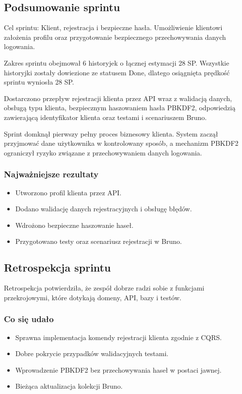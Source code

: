 \documentclass[12pt,a4paper]{article}
\begin{document}
\subsection*{Podsumowanie sprintu}
Cel sprintu: Klient, rejestracja i bezpieczne hasła. Umożliwienie klientowi założenia profilu oraz przygotowanie bezpiecznego przechowywania danych logowania.

Zakres sprintu obejmował 6 historyjek o łącznej estymacji 28 SP. Wszystkie historyjki zostały dowiezione ze statusem Done, dlatego osiągnięta prędkość sprintu wyniosła 28 SP.

Dostarczono przepływ rejestracji klienta przez API wraz z walidacją danych, obsługą typu klienta, bezpiecznym haszowaniem hasła PBKDF2, odpowiedzią zawierającą identyfikator klienta oraz testami i scenariuszem Bruno.

Sprint domknął pierwszy pełny proces biznesowy klienta. System zaczął przyjmować dane użytkownika w kontrolowany sposób, a mechanizm PBKDF2 ograniczył ryzyko związane z przechowywaniem danych logowania.

\subsubsection*{Najważniejsze rezultaty}
\begin{itemize}
\item Utworzono profil klienta przez API.
\item Dodano walidację danych rejestracyjnych i obsługę błędów.
\item Wdrożono bezpieczne haszowanie haseł.
\item Przygotowano testy oraz scenariusz rejestracji w Bruno.
\end{itemize}

\subsection*{Retrospekcja sprintu}
Retrospekcja potwierdziła, że zespół dobrze radzi sobie z funkcjami przekrojowymi, które dotykają domeny, API, bazy i testów.

\subsubsection*{Co się udało}
\begin{itemize}
\item Sprawna implementacja komendy rejestracji klienta zgodnie z CQRS.
\item Dobre pokrycie przypadków walidacyjnych testami.
\item Wprowadzenie PBKDF2 bez przechowywania haseł w postaci jawnej.
\item Bieżąca aktualizacja kolekcji Bruno.
\end{itemize}
\end{document}
